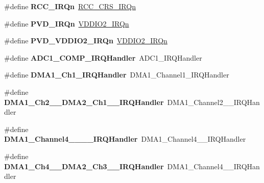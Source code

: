 \begin{DoxyCompactItemize}
\#define {\bfseries R\+C\+C\+\_\+\+I\+R\+Qn}~\hyperlink{group___peripheral__interrupt__number__definition_gga7e1129cd8a196f4284d41db3e82ad5c8a112217f6b94af93192099fb66f896608}{R\+C\+C\+\_\+\+C\+R\+S\+\_\+\+I\+R\+Qn}
\item 
\mbox{\label{group__stm32f048xx_gaf016a2890375aa890497fa1965dae1f0}} 
\#define {\bfseries P\+V\+D\+\_\+\+I\+R\+Qn}~\hyperlink{group___peripheral__interrupt__number__definition_gga7e1129cd8a196f4284d41db3e82ad5c8a967ae37c795009f0ccfb5c065ea038f9}{V\+D\+D\+I\+O2\+\_\+\+I\+R\+Qn}
\item 
\mbox{\label{group__stm32f048xx_ga6ee51c7fd35d5ddeadbff09df510e7fd}} 
\#define {\bfseries P\+V\+D\+\_\+\+V\+D\+D\+I\+O2\+\_\+\+I\+R\+Qn}~\hyperlink{group___peripheral__interrupt__number__definition_gga7e1129cd8a196f4284d41db3e82ad5c8a967ae37c795009f0ccfb5c065ea038f9}{V\+D\+D\+I\+O2\+\_\+\+I\+R\+Qn}
\item 
\mbox{\label{group__stm32f048xx_gaeb3545df015f964b68346cda78f7cea5}} 
\#define {\bfseries A\+D\+C1\+\_\+\+C\+O\+M\+P\+\_\+\+I\+R\+Q\+Handler}~A\+D\+C1\+\_\+\+I\+R\+Q\+Handler
\item 
\mbox{\label{group__stm32f048xx_ga3f7debe9fc2548ab6640825967110101}} 
\#define {\bfseries D\+M\+A1\+\_\+\+Ch1\+\_\+\+I\+R\+Q\+Handler}~D\+M\+A1\+\_\+\+Channel1\+\_\+\+I\+R\+Q\+Handler
\item 
\mbox{\label{group__stm32f048xx_ga3752ab0b9a6635ccd7bc87b99ee8fd9b}} 
\#define {\bfseries D\+M\+A1\+\_\+\+Ch2\+\_\+\_\+\+D\+M\+A2\+\_\+\+Ch1\+\_\+\_\+\+I\+R\+Q\+Handler}~D\+M\+A1\+\_\+\+Channel2\+\_\+\_\+\+I\+R\+Q\+Handler
\item 
\mbox{\label{group__stm32f048xx_gae3db46ad17e9f800e0f88b489eed522d}} 
\#define {\bfseries D\+M\+A1\+\_\+\+Channel4\+\_\+\_\+\_\+\_\+\+I\+R\+Q\+Handler}~D\+M\+A1\+\_\+\+Channel4\+\_\+\_\+\+I\+R\+Q\+Handler
\item 
\mbox{\label{group__stm32f048xx_ga035f9aa47c046222541cca70e281b415}} 
\#define {\bfseries D\+M\+A1\+\_\+\+Ch4\+\_\+\_\+\+D\+M\+A2\+\_\+\+Ch3\+\_\+\_\+\+I\+R\+Q\+Handler}~D\+M\+A1\+\_\+\+Channel4\+\_\+\_\+\+I\+R\+Q\+Handler

\end{DoxyCompactItemize}
